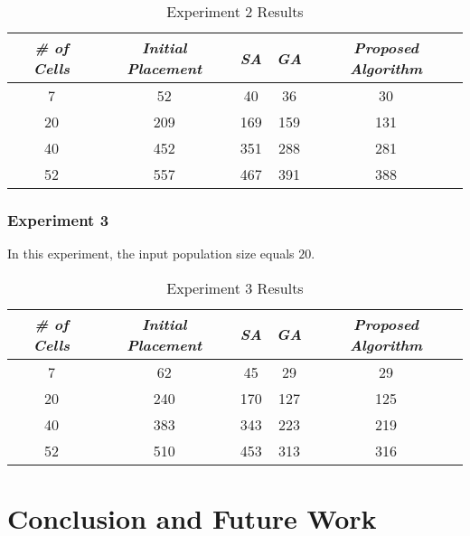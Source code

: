 \documentclass[conference]{IEEEtran}
\newcommand\T{\rule{0pt}{2.6ex}}       %
\newcommand\B{\rule[-1.2ex]{0pt}{0pt}} %
\begin{document}
\begin{table}[H]
    \caption{Experiment 2 Results}
    \centering
    \begin{tabular}{||c c c c c||}
        \hline
        \textit{\textbf{\# of Cells}} & \textit{\textbf{Initial Placement}} & \textit{\textbf{SA}} & \textit{\textbf{GA}} & \textit{\textbf{Proposed Algorithm}}\T \B \\
    \hline
    \hline
    7 & 52 & 40 & 36 & 30 \T \B\\ \hline
    20 & 209 & 169 & 159 & 131 \T \B\\ \hline
    40 & 452 & 351 & 288 & 281 \T \B\\ \hline
    52 & 557 & 467 & 391 & 388 \T \B\\ \hline
     \end{tabular}
    \label{table3}
\end{table}

\subsubsection{Experiment 3}

In this experiment, the input population size equals $20$.

\begin{table}[H]
    \caption{Experiment 3 Results}
    \centering
    \begin{tabular}{||c c c c c||}
        \hline
        \textit{\textbf{\# of Cells}} & \textit{\textbf{Initial Placement}} & \textit{\textbf{SA}} & \textit{\textbf{GA}} & \textit{\textbf{Proposed Algorithm}}\T \B \\
    \hline
    \hline
    7 & 62 & 45 & 29 & 29 \T \B\\ \hline
    20 & 240 & 170 & 127 & 125 \T \B\\ \hline
    40 & 383 & 343 & 223 & 219 \T \B\\ \hline
    52 & 510 & 453 & 313 & 316 \T \B\\ \hline
     \end{tabular}
    \label{table4}
\end{table}


\section{Conclusion and Future Work}
\end{document}
